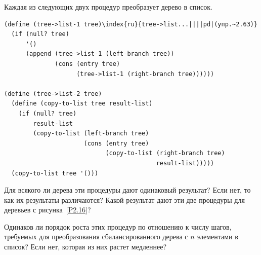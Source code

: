 \pagebreak
\begin{exercise}{2.63}\label{EX2.63}%
  Каждая из следующих двух процедур преобразует дерево в список.

\begin{Verbatim}[fontsize=\small]
(define (tree->list-1 tree)\index{ru}{tree->list...||||pd|(упр.~2.63)}
  (if (null? tree)
      '()
      (append (tree->list-1 (left-branch tree))
              (cons (entry tree)
                    (tree->list-1 (right-branch tree))))))

(define (tree->list-2 tree)
  (define (copy-to-list tree result-list)
    (if (null? tree)
        result-list
        (copy-to-list (left-branch tree)
                      (cons (entry tree)
                            (copy-to-list (right-branch tree)
                                          result-list)))))
  (copy-to-list tree '()))
\end{Verbatim}

\begin{plainenum}


\item
Для всякого ли дерева эти процедуры дают
одинаковый результат?  Если нет, то как их результаты различаются?
Какой результат дают эти две процедуры для деревьев с рисунка~\ref{P2.16}?

\item
Одинаков ли порядок роста этих процедур по
отношению к числу шагов, требуемых для преобразования
сбалансированного дерева с $n$ элементами в список?  Если
нет, которая из них растет медленнее?
\end{plainenum}
\end{exercise}
